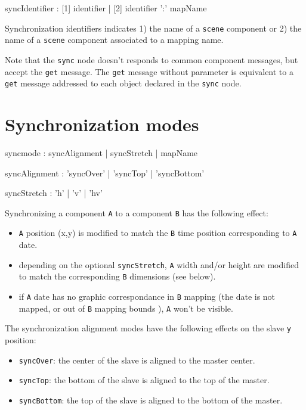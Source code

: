 \documentclass[a4paper,twoside]{report}
\newcommand{\sublevel}[1]	{\section{#1}}
\newcommand{\OSC}[1]		{\texttt{#1}}
\newcommand{\values}[1]	{\texttt{#1}}
\begin{document}
\begin{rail}
syncIdentifier : [1] identifier 
		| [2] identifier ':' mapName
\end{rail}

Synchronization identifiers indicates 1) the name of a \OSC{scene} component or 2) the name of a \OSC{scene} component associated to a mapping name.


Note that the \OSC{sync} node doesn't responds to common component messages, but accept the \OSC{get} message. 
The \OSC{get} message without parameter is equivalent to a \OSC{get} message addressed to each object declared in the \OSC{sync} node.

\sublevel{Synchronization modes}

\begin{rail}
syncmode : syncAlignment | syncStretch | mapName
\end{rail}

\begin{rail}
syncAlignment : 'syncOver' | 'syncTop' | 'syncBottom'
\end{rail}

\begin{rail}
syncStretch : 'h' | 'v' | 'hv'
\end{rail}

Synchronizing a component \values{A} to a component \values{B} has the following effect:
\begin{itemize}
\item \values{A} position (x,y) is modified to match the \values{B} time position corresponding to \values{A} date.
\item depending on the optional \OSC{syncStretch}, \values{A} width and/or height are modified to match the  corresponding \values{B} dimensions (see below).
\item if \values{A} date has no graphic correspondance in \values{B} mapping (the date is not mapped, or out of \values{B} mapping bounds ), \values{A} won't be visible.
\end{itemize}

The synchronization alignment modes have the following effects on the slave \values{y} position:
\begin{itemize}
\item \OSC{syncOver}: the center of the slave is aligned to the master center.
\item \OSC{syncTop}: the bottom of the slave is aligned to the top of the master.
\item \OSC{syncBottom}: the top of the slave is aligned to the bottom of the master.
\end{itemize}
\end{document}
